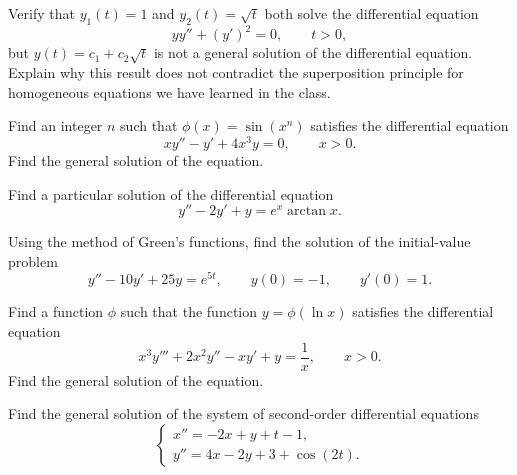 \documentclass[11pt,oneside]{article}
\begin{document}
\begin{problem}
Verify that $y_1(t)=1$ and $y_2(t)=\sqrt{t}$ both solve the differential equation
\[
yy''+(y')^2=0,
\qquad t>0,
\]
but $y(t)=c_1+c_2\sqrt{t}$ is not a general solution of the differential equation. Explain why this result does not contradict the superposition principle for homogeneous equations we have learned in the class.
\end{problem}

\begin{problem}
Find an integer $n$ such that $\phi(x)=\sin(x^n)$ satisfies the differential equation
\[
xy''-y'+4x^3y=0,
\qquad x>0.
\]
Find the general solution of the equation.
\end{problem}

\begin{problem}
Find a particular solution of the differential equation
\[
y''-2y'+y=e^x\arctan x.
\]
\end{problem}

\begin{problem}
Using the method of Green's functions, find the solution of the initial-value problem
\[
y''-10y'+25y=e^{5t},
\qquad
y(0)=-1,
\qquad
y'(0)=1.
\]
\end{problem}

\begin{problem}
Find a function $\phi$ such that the function $y=\phi(\ln x)$ satisfies the differential equation
\[
x^3y'''+2x^2y''-xy'+y=\frac{1}{x},
\qquad x>0.
\]
Find the general solution of the equation.
\end{problem}

\begin{problem}
Find the general solution of the system of second-order differential equations
\[
\begin{cases}
x''=-2x+y+t-1,\\
y''=4x-2y+3+\cos(2t).
\end{cases}
\]
\end{problem}
\end{document}
